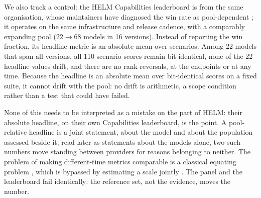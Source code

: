 We also track a control: the HELM Capabilities leaderboard is from the same organisation, whose maintainers have diagnosed the win rate as pool-dependent \citep{xu2025capabilities}; it operates on the same infrastructure and release cadence, with a comparably expanding pool ($22 \to 68$ models in 16 versions). Instead of reporting the win fraction, its headline metric is an absolute mean over scenarios. Among 22 models that span all versions, all 110 scenario scores remain bit-identical, none of the 22 headline values drift, and there are no rank reversals, at the endpoints or at any time. Because the headline is an absolute mean over bit-identical scores on a fixed suite, it cannot drift with the pool: no drift is arithmetic, a scope condition rather than a test that could have failed.

None of this needs to be interpreted as a mistake on the part of HELM: their absolute headline, on their own Capabilities leaderboard, is the point. A pool-relative headline is a joint statement, about the model and about the population assessed beside it; read later as statements about the models alone, two such numbers move standing between providers for reasons belonging to neither. The problem of making different-time metrics comparable is a classical equating problem \citep{kolen2014}, which is bypassed by estimating a scale jointly \citep{epoch2026rosetta}. The panel and the leaderboard fail identically: the reference set, not the evidence, moves the number.
